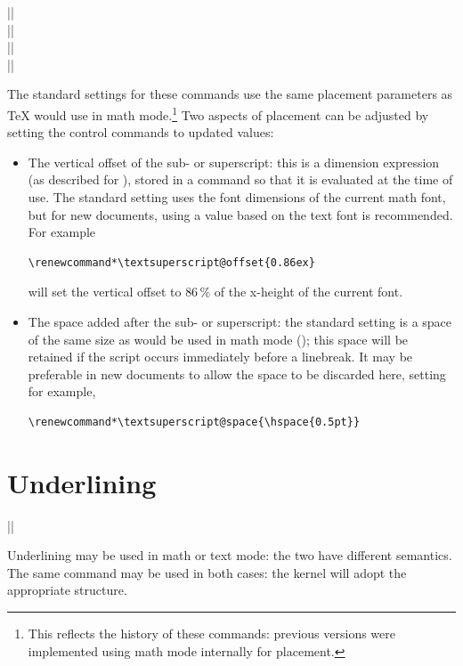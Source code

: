 \documentclass{ltxguide}
\begin{document}
\begin{decl}
  |\textsubscript@offset|   \\
  |\textsubscript@space|    \\
  |\textsuperscript@offset| \\
  |\textsuperscript@space|
\end{decl}
The standard settings for these commands use the same placement parameters as
\TeX{} would use in math mode.\footnote{This reflects the history of these
commands: previous versions were implemented using math mode internally for
placement.} Two aspects of placement can be adjusted by setting the control
commands to updated values:
\begin{itemize}
  \item The vertical offset of the sub- or superscript: this is a dimension
    expression (as described for ), stored in a command so that
    it is evaluated at the time of use. The standard setting
    uses the font dimensions of the current math font, but for new documents,
    using a value based on the text font is recommended. For example
    \begin{Verbatim}[gobble = 6]
      \renewcommand*\textsuperscript@offset{0.86ex}
    \end{Verbatim}
    will set the vertical offset to $86\,\mathrm{\%}$ of the x-height of the
    current  font.
  \item The space added after the sub- or superscript: the standard setting is
    a space of the same size as would be used in math mode
    (); this space will be retained if the script occurs
    immediately before a linebreak. It may be preferable in new documents
    to allow the space to be discarded here, setting for example,
    \begin{Verbatim}[gobble = 6]
      \renewcommand*\textsuperscript@space{\hspace{0.5pt}}
    \end{Verbatim}
\end{itemize}

\section{Underlining}

\begin{decl}
  |\underline| 
\end{decl}
Underlining may be used in math or text mode: the two have different semantics.
The same command may be used in both cases: the kernel will adopt the
appropriate structure.
\end{document}
